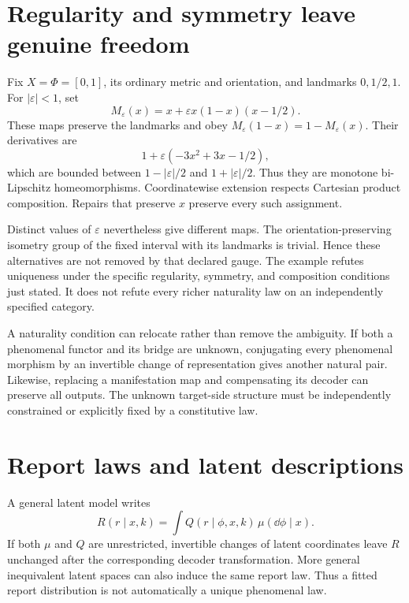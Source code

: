 \section{Regularity and symmetry leave genuine freedom}\label{section:underdetermination:regularity-and-symmetry-leave-genuine-freedom}
Fix $X=\Phi=[0,1]$, its ordinary metric and orientation, and landmarks $0,1/2,1$. For $|\varepsilon|<1$, set
\begin{equation}\label{eq:Meps}
M_\varepsilon(x)=x+\varepsilon x(1-x)(x-1/2).
\end{equation}
These maps preserve the landmarks and obey $M_\varepsilon(1-x)=1-M_\varepsilon(x)$. Their derivatives are
\[
1+\varepsilon(-3x^2+3x-1/2),
\]
which are bounded between $1-|\varepsilon|/2$ and $1+|\varepsilon|/2$. Thus they are monotone bi-Lipschitz homeomorphisms. Coordinatewise extension respects Cartesian product composition. Repairs that preserve $x$ preserve every such assignment.

Distinct values of $\varepsilon$ nevertheless give different maps. The orientation-preserving isometry group of the fixed interval with its landmarks is trivial. Hence these alternatives are not removed by that declared gauge. The example refutes uniqueness under the specific regularity, symmetry, and composition conditions just stated. It does not refute every richer naturality law on an independently specified category.

A naturality condition can relocate rather than remove the ambiguity. If both a phenomenal functor and its bridge are unknown, conjugating every phenomenal morphism by an invertible change of representation gives another natural pair. Likewise, replacing a manifestation map and compensating its decoder can preserve all outputs. The unknown target-side structure must be independently constrained or explicitly fixed by a constitutive law.

\section{Report laws and latent descriptions}\label{section:underdetermination:report-laws-and-latent-descriptions}
A general latent model writes
\begin{equation}\label{eq:latentreport}
R(r\mid x,k)=\int Q(r\mid\phi,x,k)\,\mu(\dd\phi\mid x).
\end{equation}
If both $\mu$ and $Q$ are unrestricted, invertible changes of latent coordinates leave $R$ unchanged after the corresponding decoder transformation. More general inequivalent latent spaces can also induce the same report law. Thus a fitted report distribution is not automatically a unique phenomenal law.

